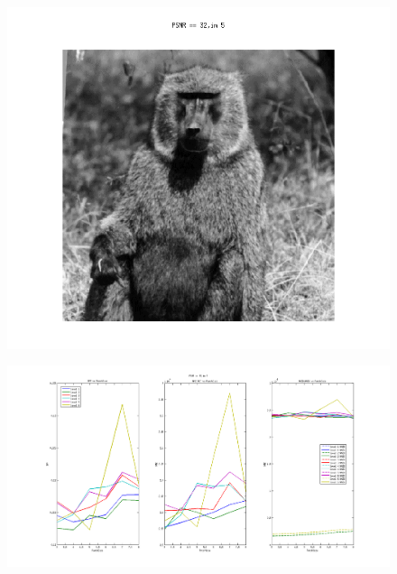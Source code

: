 \documentclass{article}
\begin{document}
\newpage 
\begin{figure}[h]
\centering
    \begin{center}
       \includegraphics[scale=0.3]{5.png}
    \end{center}
    \noindent
\end{figure}
\begin{figure}[h]
\centering
  
    \begin{center}
       \includegraphics[width=180mm]{fig5H.png}
     
    \end{center}
\end{figure}
\end{document}
